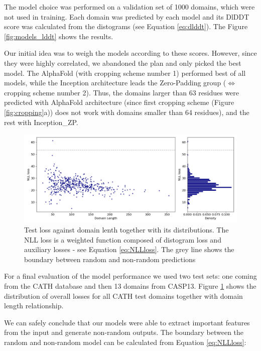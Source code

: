 The model choice was performed on a validation set of 1000 domains, which were not used in training. Each domain was predicted by each model and its DlDDT score was calculated from the distograms (see Equation \ref{eq:dlddt}). The Figure \ref{fig:models_lddt} shows the results. 

Our initial idea was to weigh the models according to these scores. However, since they were highly correlated, we abandoned the plan and only picked the best model. The AlphaFold (with cropping scheme number 1) performed best of all models, while the Inception architecture leads the Zero-Padding group ($\Leftrightarrow$ cropping scheme number 2). Thus, the domains larger than 63 residues were predicted with AlphaFold architecture (since first cropping scheme (Figure \ref{fig:cropping}a)) does not work with domains smaller than 64 residues), and the rest with Inception\_ZP. 

\begin{figure}
    \centering
    \includegraphics[width=\linewidth]{imgs_tomas/test_losses_distributions.png}
    \caption{Test loss against domain lenth together with its distributions. The NLL loss is a weighted function composed of distogram loss and auxiliary losses - see Equation \ref{eq:NLLloss}. The grey line shows the boundary between random and non-random predictions}
    \label{fig:test_losses}
\end{figure}

For a final evaluation of the model performance we used two test sets: one coming from the CATH database and then 13 domains from CASP13. Figure \ref{fig:test_losses} shows the distribution of overall losses for all CATH test domains together with domain length relationship. 

We can safely conclude that our models were able to extract important features from the input and generate non-random outputs. The boundary between the random and non-random model can be calculated from Equation \ref{eq:NLLloss}:

